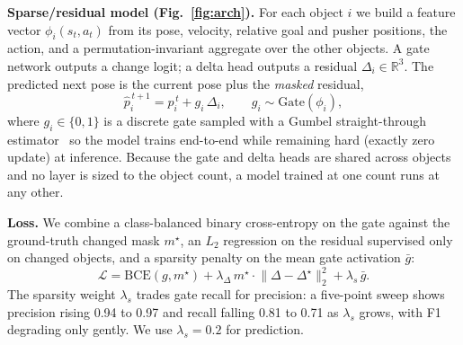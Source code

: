 \documentclass[conference]{IEEEtran}
\begin{document}
\textbf{Sparse/residual model (Fig.~\ref{fig:arch}).} For each object $i$ we build a
feature vector $\phi_i(s_t,a_t)$ from its pose, velocity, relative goal and pusher
positions, the action, and a permutation-invariant aggregate over the other objects.
A gate network outputs a change logit; a delta head outputs a residual
$\Delta_i\in\mathbb{R}^3$. The predicted next pose is the current pose plus the
\emph{masked} residual,
\begin{equation}
  \hat{p}_i^{\,t+1} = p_i^{\,t} + g_i \,\Delta_i, \qquad g_i \sim \text{Gate}(\phi_i),
  \label{eq:pred}
\end{equation}
where $g_i\in\{0,1\}$ is a discrete gate sampled with a Gumbel straight-through
estimator~\cite{jang2017gumbel,bengio2013conditional} so the model trains end-to-end
while remaining hard (exactly zero update) at inference. Because the gate and delta
heads are shared across objects and no layer is sized to the object count, a model
trained at one count runs at any other.

\textbf{Loss.} We combine a class-balanced binary cross-entropy on the gate against
the ground-truth changed mask $m^\star$, an $L_2$ regression on the residual
supervised only on changed objects, and a sparsity penalty on the mean gate
activation $\bar g$:
\begin{equation}
  \mathcal{L} = \mathrm{BCE}(g, m^\star) + \lambda_\Delta\, m^\star \!\cdot\! \lVert \Delta - \Delta^\star \rVert_2^2 + \lambda_s\, \bar{g}.
  \label{eq:loss}
\end{equation}
The sparsity weight $\lambda_s$ trades gate recall for precision: a five-point sweep
shows precision rising 0.94 to 0.97 and recall falling 0.81 to 0.71 as $\lambda_s$
grows, with F1 degrading only gently. We use $\lambda_s{=}0.2$ for prediction.
\end{document}

